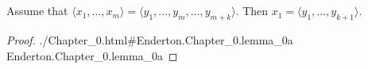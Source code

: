 \documentclass{article}
\newcommand{\lean}[1]{\leanref
  {./Chapter\_0.html\#Enderton.Chapter\_0.#1}
  {Enderton.Chapter\_0.#1}}
\begin{document}

\section*{}%
\label{sec:lemma-0a}

Assume that $\langle x_1, \ldots, x_m \rangle =
  \langle y_1, \ldots, y_m, \ldots, y_{m+k} \rangle$.
Then $x_1 = \langle y_1, \ldots, y_{k+1} \rangle$.

\begin{proof}

  \lean{lemma\_0a}

\end{proof}
\end{document}
